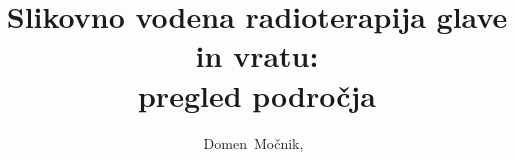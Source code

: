 \documentclass[journal]{IEEEtran}
\begin{document}
%
\title{Slikovno vodena radioterapija glave in vratu:\\pregled področja}
%
%
%

\author{Domen~Močnik,~}%

% 
%



% 
\end{document}
